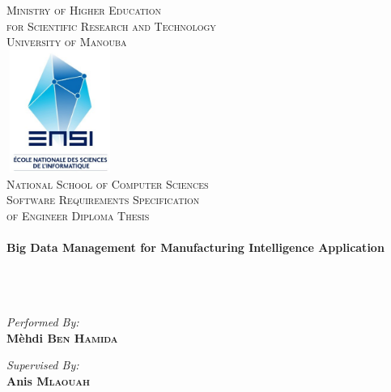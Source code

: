 \begin{titlepage}
\begin{center}

\textsc{Ministry of Higher Education \\ for Scientific Research and Technology\\
University of Manouba}
\\[0.7cm]
   
\includegraphics[width=3.5cm,height=4cm]{./logoEnsi}~\\[1cm]

\textsc{\LARGE National School of Computer Sciences}\\[1cm]



\textsc{\Large Software Requirements Specification\\ of Engineer Diploma Thesis}\\[0.5cm]

\HRule \\[0.4cm]
{\huge \bfseries Big Data Management for Manufacturing Intelligence Application \\[0.4cm] }
\HRule \\[0.5cm]

~\\
~\\

\begin{minipage}{0.4\textwidth}
\begin{flushleft} \large
\emph{Performed By:}\\
\textbf{Mèhdi \textsc{\bf Ben Hamida}\\} 
\end{flushleft}
\end{minipage}
\begin{minipage}{0.4\textwidth}
\begin{flushright} \large
\emph{Supervised By:} \\
\textbf{Anis \textsc{\bf Mlaouah}\\} 
\end{flushright}
\end{minipage}


\end{center}
\end{titlepage}
